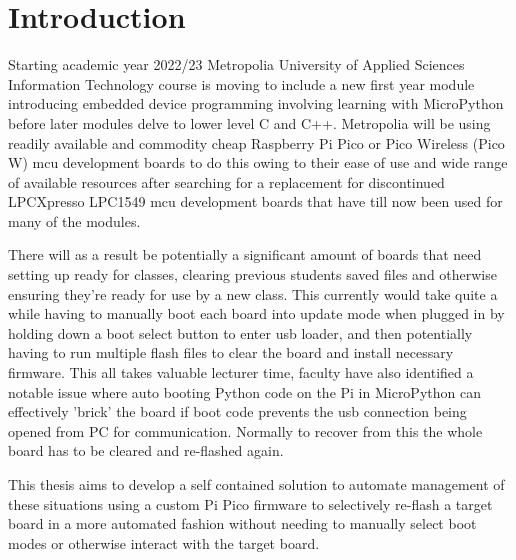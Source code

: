 
\chapter{Introduction}

Starting academic year 2022/23 Metropolia University of Applied Sciences Information Technology course is moving to include a new first year module introducing embedded device programming involving learning with MicroPython before later modules delve to lower level C and C++. Metropolia will be using readily available and commodity cheap Raspberry Pi Pico or Pico Wireless (Pico W) \gls{mcu} development boards to do this owing to their ease of use and wide range of available resources after searching for a replacement for discontinued LPCXpresso LPC1549 \gls{mcu} development boards that have till now been used for many of the modules.

There will as a result be potentially a significant amount of boards that need setting up ready for classes, clearing previous students saved files and otherwise ensuring they're ready for use by a new class. This currently would take quite a while having to manually boot each board into update mode when plugged in by holding down a boot select button to enter \gls{usb} loader, and then potentially having to run multiple flash files to clear the board and install necessary firmware. This all takes valuable lecturer time, faculty have also identified a notable issue where auto booting Python code on the Pi in MicroPython can effectively 'brick' the board if boot code prevents the \gls{usb} connection being opened from PC for communication. Normally to recover from this the whole board has to be cleared and re-flashed again.

This thesis aims to develop a self contained solution to automate management of these situations using a custom Pi Pico firmware to selectively re-flash a target board in a more automated fashion without needing to manually select boot modes or otherwise interact with the target board.
